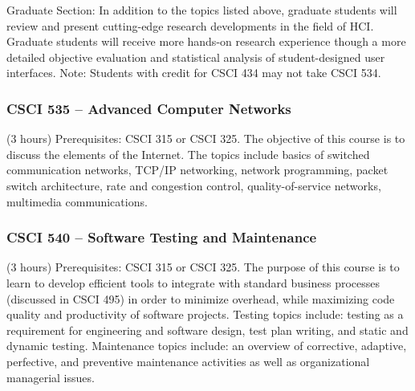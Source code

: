 Graduate Section: In addition to the topics listed above, graduate students will review and present cutting-edge research developments in the field of HCI. Graduate students will receive more hands-on research experience though a more detailed objective evaluation and statistical analysis of student-designed user interfaces. Note: Students with credit for CSCI 434 may not take CSCI 534.

\subsubsection{CSCI 535 -- Advanced Computer Networks}
(3 hours) Prerequisites:  CSCI 315 or CSCI 325. The objective of this course is to discuss the elements of the Internet. The topics include basics of switched communication networks, TCP/IP networking, network programming, packet switch architecture, rate and congestion control, quality-of-service networks, multimedia communications. 

\subsubsection{CSCI 540 -- Software Testing and Maintenance}
(3 hours) Prerequisites:  CSCI 315 or CSCI 325. The purpose of this course is to learn to develop efficient tools to integrate with standard business processes (discussed in CSCI 495) in order to minimize overhead, while maximizing code quality and productivity of software projects.  Testing topics include: testing as a requirement for engineering and software design, test plan writing, and static and dynamic testing. Maintenance topics include: an overview of corrective, adaptive, perfective, and preventive maintenance activities as well as organizational managerial issues. 

